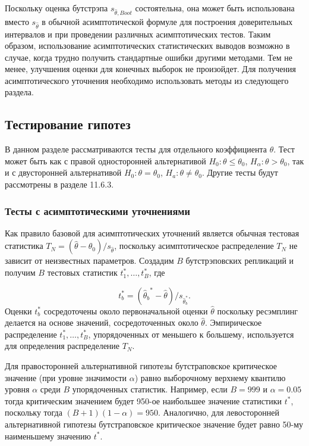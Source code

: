 Поскольку оценка бутстрэпа $s_{\hat{\theta},Boot}$ состоятельна, она может быть использована вместо $s_{\hat{\theta}}$ в обычной асимптотической формуле для построения доверительных интервалов и при проведении различных асимптотических тестов. Таким образом, использование асимптотических статистических выводов возможно в случае, когда трудно получить стандартные ошибки другими методами. Тем не менее, улучшения оценки для конечных выборок не произойдет. Для получения асимптотического уточнения необходимо использовать методы из следующего раздела.

\subsection{Тестирование гипотез}

В данном разделе рассматриваются тесты для отдельного коэффициента $\theta$. Тест может быть как с правой односторонней альтернативой $H_0:\theta \leq \theta_0$, $H_{\alpha}:\theta > \theta_0$, так и с двусторонней альтернативой $H_0: \theta = \theta_0$, $H_a: \theta \not= \theta_0$. Другие тесты будут рассмотрены в разделе 11.6.3.

\subsubsection*{Тесты с асимптотическими уточнениями}

Как правило базовой для асимптотических уточнений является обычная тестовая статистика $T_N=(\hat{\theta}-\theta_0)/s_{\hat{\theta}}$, поскольку асимптотическое распределение $T_N$ не зависит от неизвестных параметров. Создадим $B$ бутстрэповских репликаций и получим $B$ тестовых статистик $t_1^*,\ldots ,t_B^*$, где 

\begin{equation}
t_b^*=({\hat{\theta}_b}^*-\hat{\theta})/s_{{\hat{\theta}}_b^*}.
\end{equation}
Оценки $t_b^*$ сосредоточены около первоначальной оценки $\hat{\theta}$ поскольку ресэмплинг делается на основе значений, сосредоточенных около $\hat{\theta}$. Эмпирическое распределение $t_1^*, \ldots, t_B^*$, упорядоченных от меньшего к большему, используется для определения распределение $T_N$.

Для правосторонней альтернативной гипотезы бутстраповское критическое значение (при уровне значимости $\alpha$) равно выборочному верхнему квантилю уровня $\alpha$ среди $B$ упорядоченных статистик. Например, если $B=999$ и $\alpha=0.05$ тогда критическим значением будет 950-ое наибольшее значение статистики $t^*$, поскольку тогда $(B+1)(1-\alpha)=950$. Аналогично, для левосторонней альтернативной гипотезы  бутстраповское критическое значение  будет равно 50-му наименьшему значению $t^*$.


